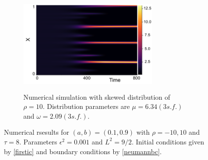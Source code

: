 \begin{figure}[H]
\begin{subfigure}[t]{0.45\textwidth}
        \label{}
    \end{subfigure}
    \hfill
    \begin{subfigure}[t]{0.45\textwidth}
        \centering
        \includegraphics[width=7cm,height=5cm]{skewt810.png}
        \caption{Numerical simulation with skewed distribution of $\rho=10$. Distribution parameters are $\mu=6.34(3 s.f.)$ and $\omega=2.09(3 s.f.)$.}
        \label{}
    \end{subfigure}
    \caption{Numerical rsesults for $(a,b)=(0.1,0.9)$ with $\rho=-10,10$ and $\tau=8$. Parameters $\epsilon^2=0.001$ and $L^2=9/2$. Initial conditions given by \eqref{firstic} and boundary conditions by \eqref{neumannbc}.}
    \label{fig:linskew8}
\end{figure}
